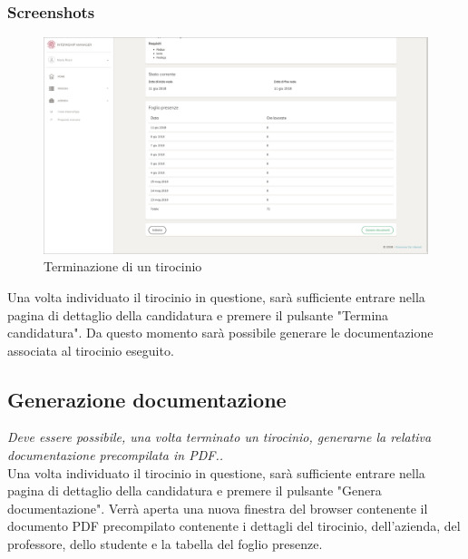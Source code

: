 \subsubsection{Screenshots}
\begin{figure}[H]
	\centering
	\includegraphics[width=1\textwidth]{Figs/screenshots/internshipended}     
	\caption[Screenshot: terminazione di un tirocinio]{Terminazione di un tirocinio}
	\label{fig:screenshot:9}
\end{figure}

\noindent
Una volta individuato il tirocinio in questione, sarà sufficiente entrare nella pagina di dettaglio della candidatura e premere il pulsante "Termina candidatura". Da questo momento sarà possibile generare le documentazione associata al tirocinio eseguito.

\pagebreak
\subsection{Generazione documentazione}
\textit{Deve essere possibile, una volta terminato un tirocinio, generarne la relativa documentazione precompilata in PDF..} \\

\noindent
Una volta individuato il tirocinio in questione, sarà sufficiente entrare nella pagina di dettaglio della candidatura e premere il pulsante "Genera documentazione". Verrà aperta una nuova finestra del browser contenente il documento PDF precompilato contenente i dettagli del tirocinio, dell'azienda, del professore, dello studente e la tabella del foglio presenze.

